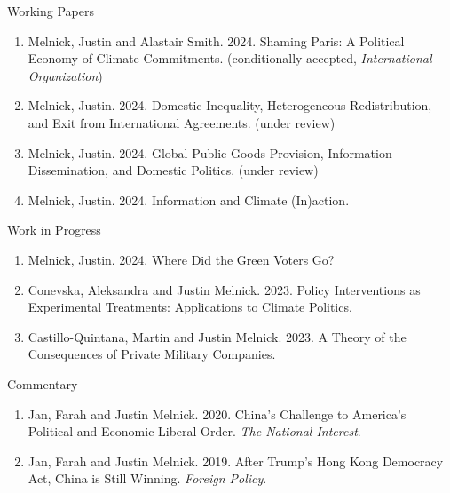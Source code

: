 \documentclass{resume} %
\begin{document}
\begin{rSection}{Working Papers}

\begin{enumerate}

           \item Melnick, Justin and Alastair Smith. 2024. Shaming Paris: A Political Economy of Climate Commitments. (conditionally accepted, \textit{International Organization})
            \item Melnick, Justin. 2024. Domestic Inequality, Heterogeneous Redistribution, and Exit from International Agreements. (under review)
                \item Melnick, Justin. 2024. Global Public Goods Provision, Information Dissemination, and Domestic Politics. (under review)
                    \item Melnick, Justin. 2024. Information and Climate (In)action.
\end{enumerate}

\end{rSection}

\begin{rSection}{Work in Progress}

\begin{enumerate}
    \item Melnick, Justin. 2024. Where Did the Green Voters Go?
    \item Conevska, Aleksandra and Justin Melnick. 2023. Policy Interventions as Experimental Treatments: Applications to Climate Politics.
    \item Castillo-Quintana, Martin and Justin Melnick. 2023. A Theory of the Consequences of Private Military Companies.
\end{enumerate}

\end{rSection}

\begin{rSection}{Commentary}
    \begin{enumerate}
    \item   Jan, Farah and Justin Melnick. 2020. China's Challenge to America's Political and Economic Liberal Order. \textit{The National Interest}.
    \item    Jan, Farah and Justin Melnick. 2019. After Trump's Hong Kong Democracy Act, China is Still Winning. \textit{Foreign Policy}.
\end{enumerate}
\end{rSection}

\newpage
\end{document}
